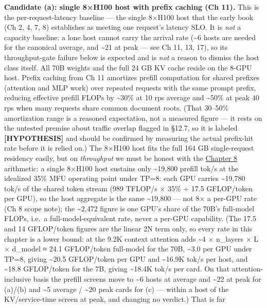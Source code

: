 \textbf{Candidate (a): single 8×H100 host with prefix caching (Ch 11).}
This is the per-request-latency baseline --- the single 8×H100 host that
the early book (Ch 2, 4, 7, 8) establishes as meeting one request's
latency SLO. It is \emph{not} a capacity baseline: a lone host cannot
carry the arrival rate (\textasciitilde6 hosts are needed for the
canonical average, and \textasciitilde21 at peak --- see Ch 11, 13, 17),
so its throughput-gate failure below is expected and is \emph{not} a
reason to dismiss the host class itself. All 70B weights and the full 24
GB KV cache reside on the 8-GPU host. Prefix caching from Ch 11
amortizes prefill computation for shared prefixes (attention and MLP
work) over repeated requests with the same prompt prefix, reducing
effective prefill FLOPs by \textasciitilde30\% at 10 rps average and
\textasciitilde50\% at peak 40 rps when many requests share common
document roots. (That 30--50\% amortization range is a reasoned
expectation, not a measured figure --- it rests on the untested premise
about traffic overlap flagged in §12.7, so it is labeled
\textbf{\mbox{{[}HYPOTHESIS{]}}} and should be confirmed by measuring the
actual prefix-hit rate before it is relied on.) The 8×H100 host fits the
full 164 GB single-request residency easily, but on \emph{throughput} we
must be honest with the \hyperref[chap:8]{Chapter 8} arithmetic: a single 8×H100 host
sustains only \textasciitilde19,800 prefill tok/s at the idealized 35\%
MFU operating point under TP=8: each GPU carries \textasciitilde19,780
tok/s of the shared token stream (989 TFLOP/s × 35\% ÷ 17.5 GFLOP/token
per GPU), so the host aggregate is the same \textasciitilde19,800 ---
not 8× a per-GPU rate (Ch 8 scope note); the \textasciitilde2,472 figure
is one GPU's share of the 70B's full-model FLOPs, i.e.~a
full-model-equivalent rate, never a per-GPU capability. (The 17.5 and 14
GFLOP/token figures are the linear 2N term only, so every rate in this
chapter is a lower bound: at the 9.2K context attention adds
\textasciitilde4 × n\_layers × L × d\_model ≈ 24.1 GFLOP/token
full-model for the 70B, \textasciitilde3.0 per GPU under TP=8, giving
\textasciitilde20.5 GFLOP/token per GPU and \textasciitilde16.9K tok/s
per host, and \textasciitilde18.8 GFLOP/token for the 7B, giving
\textasciitilde18.4K tok/s per card. On that attention-inclusive basis
the prefill screens move to \textasciitilde6 hosts at average and
\textasciitilde22 at peak for (a)/(b) and \textasciitilde5 average /
\textasciitilde20 peak cards for (c) --- within a host of the
KV/service-time screen at peak, and changing no verdict.) That is far
